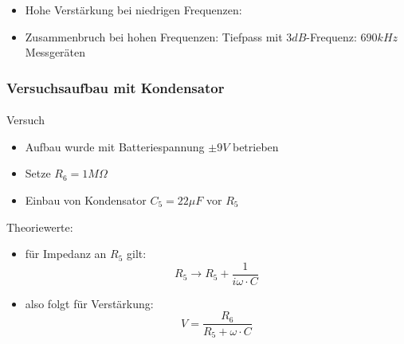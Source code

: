 \begin{frame}
\begin{columns}[c]
\begin{figure}[H]
\begin{center}
        \end{center}
        \end{figure}
    \end{columns}
    \begin{block}{}
        \begin{itemize}
            \item Hohe Verstärkung bei niedrigen Frequenzen: 
            \item Zusammenbruch bei hohen Frequenzen: Tiefpass mit
            $3dB$-Frequenz: $690kHz$
            Messgeräten
        \end{itemize}
    \end{block}
\end{frame}

\begin{frame}
\frametitle{Versuchsaufbau mit Kondensator}
\framesubtitle{}
    \begin{block}{Versuch}
        \begin{itemize}
            \item Aufbau wurde mit Batteriespannung $\pm 9V$ betrieben
            \item Setze $R_6 = 1M\Omega$
            \item Einbau von Kondensator $C_5 = 22\mu F$ vor $R_5$
        \end{itemize}    
    \end{block}    
    \begin{block}{Theoriewerte:}
    \begin{itemize}
        \item für Impedanz an $R_5$ gilt:
            \begin{equation*}
                R_5 \rightarrow R_5 + \frac{1}{i \omega \cdot C}    
            \end{equation*}
        \item also folgt für Verstärkung:
            \begin{equation*}
                V = \frac{R_6}{R_5 + \omega \cdot C}
            \end{equation*}
    \end{itemize}
    \end{block}
\end{frame}

